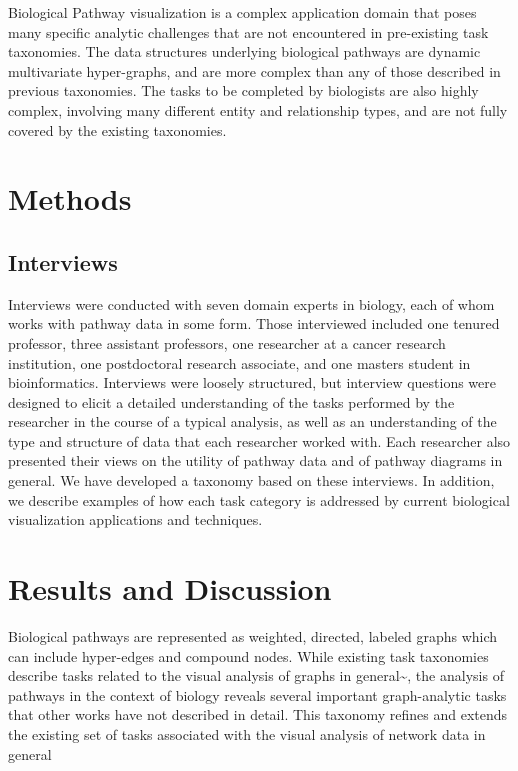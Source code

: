 Biological Pathway visualization is a complex application domain that poses many specific analytic challenges that are not encountered in pre-existing task taxonomies.
The data structures underlying biological pathways are dynamic multivariate hyper-graphs, and are more complex than any of those described in previous taxonomies.
The tasks to be completed by biologists are also highly complex, involving many different entity and relationship types, and are not fully covered by the existing taxonomies.

\section*{Methods}

\subsection*{Interviews}

Interviews were conducted with seven domain experts in biology, each of whom works with pathway data in some form.
Those interviewed included one tenured professor, three assistant professors, one researcher at a cancer research institution, one postdoctoral research associate, and one masters student in bioinformatics.
Interviews were loosely structured, but interview questions were designed to elicit a detailed understanding of the tasks performed by the researcher in the course of a typical analysis, as well as an understanding of the type and structure of data that each researcher worked with.
Each researcher also presented their views on the utility of pathway data and of pathway diagrams in general.
We have developed a taxonomy based on these interviews.
In addition, we describe examples of how each task category is addressed by current biological visualization applications and techniques.

\section*{Results and Discussion}

Biological pathways are represented as weighted, directed, labeled graphs which can include hyper-edges and compound nodes.
While existing task taxonomies describe tasks related to the visual analysis of graphs in general\textasciitilde{}\cite{Ahn2014, Pretorius2014}, the analysis of pathways in the context of biology reveals several important graph-analytic tasks that other works have not described in detail.
This taxonomy refines and extends the existing set of tasks associated with the visual analysis of network data in general

